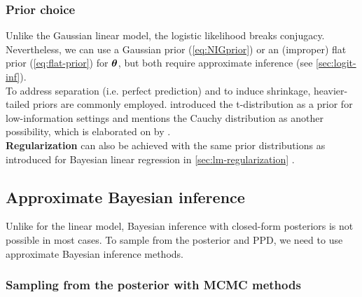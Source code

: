 \subsubsection*{Prior choice}

Unlike the Gaussian linear model, the logistic likelihood breaks conjugacy.
Nevertheless, we can use a Gaussian prior (\autoref{eq:NIGprior}) or an (improper) flat prior (\autoref{eq:flat-prior}) for $\bm{\theta}$, but both require approximate inference (see \autoref{sec:logit-inf}).\\

To address separation (i.e. perfect prediction) and to induce shrinkage, heavier-tailed priors are commonly employed.
\citet{gelman_weakly_2008} introduced the t-distribution as a prior for low-information settings and mentions the Cauchy distribution as another possibility, which is elaborated on by .\\

\textbf{Regularization} can also be achieved with the same prior distributions as introduced for Bayesian linear regression in \autoref{sec:lm-regularization} .

\subsection{Approximate Bayesian inference} \label{sec:logit-inf}

Unlike for the linear model, Bayesian inference with closed-form posteriors is not possible in most cases.
To sample from the posterior and PPD, we need to use approximate Bayesian inference methods.

\subsubsection*{Sampling from the posterior with MCMC methods}

